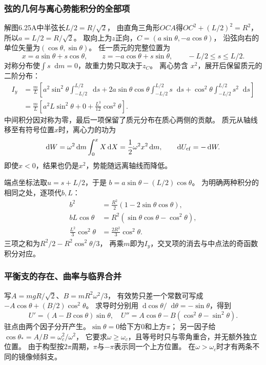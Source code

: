 \documentclass[UTF8,fontset=fandol,a4paper,11pt]{ctexart}
\newcommand{\dd}{\mathop{}\!\mathrm{d}}
\begin{document}
\subsubsection*{弦的几何与离心势能积分的全部项}
解图6.25A中半弦长$L/2=R/\sqrt2$，
由直角三角形$OCA$得$OC^2+(L/2)^2=R^2$，
所以$a=L/2=R/\sqrt2$。
取向上为$z$正向，$C=(a\sin\theta,-a\cos\theta)$，
沿弦向右的单位矢量为$(\cos\theta,\sin\theta)$。
任一质元的完整位置为
\[
x=a\sin\theta+s\cos\theta,\qquad
z=-a\cos\theta+s\sin\theta,\qquad -L/2\leq s\leq L/2.
\]
对称分布使$\int s\dd m=0$，故重力势只取决于$z_C$。
离心势含 $x^2$，展开后保留质元的二阶分布：
\[
\begin{aligned}
I_y&=\frac mL\left[
a^2\sin^2\theta\int_{-L/2}^{L/2}\dd s
+2a\sin\theta\cos\theta\int_{-L/2}^{L/2}s\dd s
+\cos^2\theta\int_{-L/2}^{L/2}s^2\dd s\right]\\
&=\frac mL\left[a^2L\sin^2\theta+0+
\frac{L^3}{12}\cos^2\theta\right].
\end{aligned}
\]
中间积分因对称为零，最后一项保留了质元分布在质心两侧的贡献。
质元从轴线移至有符号位置$x$时，离心力的功为
\[
\dd W=\omega^2\dd m\int_0^x X\dd X
=\frac12\omega^2x^2\dd m,
\qquad \dd U_{\rm cf}=-\dd W.
\]
即使$x<0$，结果也仍是$x^2$，势能随远离轴线而降低。

端点坐标法取$u=s+L/2$，于是
$b=a\sin\theta-(L/2)\cos\theta$。
为明确两种积分的相同之处，逐项代$b,L$：
\[
\begin{aligned}
b^2&=\frac{R^2}{2}(1-2\sin\theta\cos\theta),\\
bL\cos\theta&=R^2(\sin\theta\cos\theta-\cos^2\theta),\\
\frac{L^2}{3}\cos^2\theta&=\frac{2R^2}{3}\cos^2\theta.
\end{aligned}
\]
三项之和为$R^2/2-R^2\cos^2\theta/3$，
再乘$m$即为$I_y$，交叉项的消去与中点法的奇函数积分对应。

\subsubsection*{平衡支的存在、曲率与临界合并}
写$A=mgR/\sqrt2$、$B=mR^2\omega^2/3$，
有效势只差一个常数可写成$-A\cos\theta+(B/2)\cos^2\theta$。
求导时分别用$\dd\cos\theta/\dd\theta=-\sin\theta$，得到
\[
U'=(A-B\cos\theta)\sin\theta,
\quad U''=A\cos\theta-B(\cos^2\theta-\sin^2\theta).
\]
驻点由两个因子分开产生。$\sin\theta=0$给下方$0$和上方$\pi$；
另一因子给$\cos\theta_*=A/B=\omega_c^2/\omega^2$，
它要求$\omega\geq\omega_c$，且等号时只与零角重合，并无额外独立位置。
由于构型按$2\pi$周期，$\pi$与$-\pi$表示同一个上方位置。
在$\omega>\omega_c$时才有两条不同的镜像倾斜支。
\end{document}
